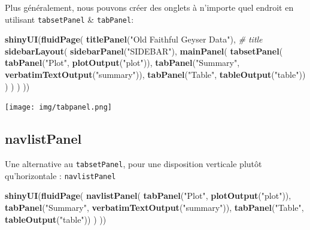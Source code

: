 \documentclass[
]{article}
\newenvironment{Shaded}{\begin{snugshade}}{\end{snugshade}}
\newcommand{\CommentTok}[1]{\textcolor[rgb]{0.56,0.35,0.01}{\textit{#1}}}
\newcommand{\FunctionTok}[1]{\textcolor[rgb]{0.13,0.29,0.53}{\textbf{#1}}}
\newcommand{\NormalTok}[1]{#1}
\newcommand{\StringTok}[1]{\textcolor[rgb]{0.31,0.60,0.02}{#1}}
\begin{document}
Plus généralement, nous pouvons créer des onglets à n'importe quel
endroit en utilisant \texttt{tabsetPanel} \& \texttt{tabPanel}:

\begin{Shaded}
\begin{Highlighting}[]
\FunctionTok{shinyUI}\NormalTok{(}\FunctionTok{fluidPage}\NormalTok{(}
  \FunctionTok{titlePanel}\NormalTok{(}\StringTok{"Old Faithful Geyser Data"}\NormalTok{), }\CommentTok{\# title}
  \FunctionTok{sidebarLayout}\NormalTok{(}
    \FunctionTok{sidebarPanel}\NormalTok{(}\StringTok{"SIDEBAR"}\NormalTok{),}
    \FunctionTok{mainPanel}\NormalTok{(}
      \FunctionTok{tabsetPanel}\NormalTok{(}
        \FunctionTok{tabPanel}\NormalTok{(}\StringTok{"Plot"}\NormalTok{, }\FunctionTok{plotOutput}\NormalTok{(}\StringTok{"plot"}\NormalTok{)), }
        \FunctionTok{tabPanel}\NormalTok{(}\StringTok{"Summary"}\NormalTok{, }\FunctionTok{verbatimTextOutput}\NormalTok{(}\StringTok{"summary"}\NormalTok{)), }
        \FunctionTok{tabPanel}\NormalTok{(}\StringTok{"Table"}\NormalTok{, }\FunctionTok{tableOutput}\NormalTok{(}\StringTok{"table"}\NormalTok{))}
\NormalTok{      )}
\NormalTok{    )}
\NormalTok{  )}
\NormalTok{))}
\end{Highlighting}
\end{Shaded}

\texttt{[image: img/tabpanel.png]}

\hypertarget{navlistpanel}{%
\subsection{navlistPanel}\label{navlistpanel}}

Une alternative au \texttt{tabsetPanel}, pour une disposition verticale
plutôt qu'horizontale : \texttt{navlistPanel}

\begin{Shaded}
\begin{Highlighting}[]
\FunctionTok{shinyUI}\NormalTok{(}\FunctionTok{fluidPage}\NormalTok{(}
  \FunctionTok{navlistPanel}\NormalTok{(}
    \FunctionTok{tabPanel}\NormalTok{(}\StringTok{"Plot"}\NormalTok{, }\FunctionTok{plotOutput}\NormalTok{(}\StringTok{"plot"}\NormalTok{)), }
    \FunctionTok{tabPanel}\NormalTok{(}\StringTok{"Summary"}\NormalTok{, }\FunctionTok{verbatimTextOutput}\NormalTok{(}\StringTok{"summary"}\NormalTok{)), }
    \FunctionTok{tabPanel}\NormalTok{(}\StringTok{"Table"}\NormalTok{, }\FunctionTok{tableOutput}\NormalTok{(}\StringTok{"table"}\NormalTok{))}
\NormalTok{  )}
\NormalTok{))}
\end{Highlighting}
\end{Shaded}
\end{document}
